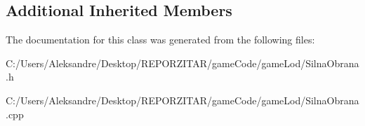\subsection*{Additional Inherited Members}


The documentation for this class was generated from the following files\+:\begin{DoxyCompactItemize}
\item 
C\+:/\+Users/\+Aleksandre/\+Desktop/\+R\+E\+P\+O\+R\+Z\+I\+T\+A\+R/game\+Code/game\+Lod/Silna\+Obrana.\+h\item 
C\+:/\+Users/\+Aleksandre/\+Desktop/\+R\+E\+P\+O\+R\+Z\+I\+T\+A\+R/game\+Code/game\+Lod/Silna\+Obrana.\+cpp\end{DoxyCompactItemize}
